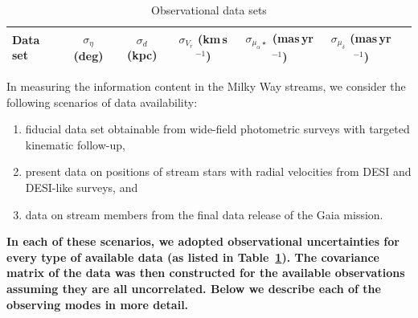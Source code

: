 \documentclass[modern]{aastex62}
\begin{document}
\begin{table}
\begin{center}
\begin{tabular}{l c c c c c c}
\hline
\hline
Data set & $\sigma_\eta$ (deg) & $\sigma_d$ (kpc) & $\sigma_{V_r}$ (km\,s$^{-1}$) & $\sigma_{\mu_\alpha\star}$ (mas\,yr$^{-1}$) & $\sigma_{\mu_\delta}$ (mas\,yr$^{-1}$) \\
\hline

\hline
\hline
\end{tabular}
\caption{Observational data sets}
\label{t:datasets}
\end{center}
\end{table}

In measuring the information content in the Milky Way streams, we consider the following scenarios of data availability:
\begin{enumerate}
\item fiducial data set obtainable from wide-field photometric surveys with targeted kinematic follow-up,
\item present data on positions of stream stars with radial velocities from DESI and DESI-like surveys, and
\item data on stream members from the final data release of the Gaia mission.
\end{enumerate}
{\bf In each of these scenarios, we adopted observational uncertainties for every type of available data (as listed in Table~\ref{t:datasets}).
The covariance matrix of the data was then constructed for the available observations assuming they are all uncorrelated.
Below we describe each of the observing modes in more detail.}
\end{document}
